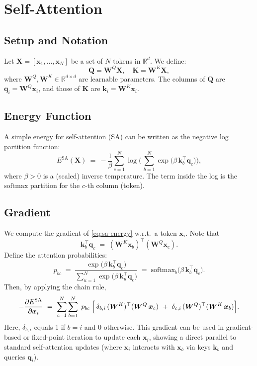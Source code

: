 \documentclass{article}
\begin{document}
\section{Self-Attention}

\subsection{Setup and Notation}

Let \(\bm{X} = [\bm{x}_1, \ldots, \bm{x}_N]\) be a set of \(N\) tokens in \(\mathbb{R}^d\). We define:
\[
\bm{Q} = \bm{W}^Q \bm{X}, 
\quad
\bm{K} = \bm{W}^K \bm{X},
\]
where \(\bm{W}^Q, \bm{W}^K \in \mathbb{R}^{d \times d}\) are learnable parameters. The columns of \(\bm{Q}\) are \(\bm{q}_i = \bm{W}^Q \bm{x}_i\), and those of \(\bm{K}\) are \(\bm{k}_i = \bm{W}^K \bm{x}_i\).

\subsection{Energy Function}

A simple energy for self-attention (SA) can be written as the negative log partition function:
\begin{equation}
E^{\text{SA}}(\bm{X}) 
~=~ -\frac{1}{\beta} \sum_{c=1}^N \log \biggl(\,\sum_{b=1}^N \exp \bigl(\beta \,\bm{k}_b^\top \bm{q}_c \bigr)\biggr),
\label{eq:sa-energy}
\end{equation}
where \(\beta > 0\) is a (scaled) inverse temperature. The term inside the log is the \(\mathrm{softmax}\) partition for the \(c\)-th column (token).

\subsection{Gradient}

We compute the gradient of \eqref{eq:sa-energy} w.r.t.\ a token \(\bm{x}_i\). Note that
\[
\bm{k}_b^\top \bm{q}_c \;=\; 
(\bm{W}^K \bm{x}_b)^\top (\bm{W}^Q \bm{x}_c).
\]
Define the attention probabilities:
\[
p_{bc} \;=\; 
\frac{\exp \bigl(\beta\,\bm{k}_b^\top \bm{q}_c \bigr)}{\sum_{u=1}^N \exp \bigl(\beta\,\bm{k}_u^\top \bm{q}_c \bigr)}
\;=\;
\mathrm{softmax}_b \bigl(\beta\,\bm{k}_b^\top \bm{q}_c\bigr).
\]
Then, by applying the chain rule,
\[
-\frac{\partial E^{\text{SA}}}{\partial \bm{x}_i}
~=~
\sum_{c=1}^N \sum_{b=1}^N \; p_{bc} \;\Bigl[
\,\delta_{b,i}\,(\bm{W}^K)^\top (\bm{W}^Q\,\bm{x}_c)
~+~
\delta_{c,i}\,(\bm{W}^Q)^\top (\bm{W}^K\,\bm{x}_b)\Bigr].
\]
Here, \(\delta_{b,i}\) equals 1 if \(b=i\) and 0 otherwise. This gradient can be used in gradient-based or fixed-point iteration to update each \(\bm{x}_i\), showing a direct parallel to standard self-attention updates (where \(\bm{x}_i\) interacts with \(\bm{x}_b\) via keys \(\bm{k}_b\) and queries \(\bm{q}_i\)).
\end{document}
